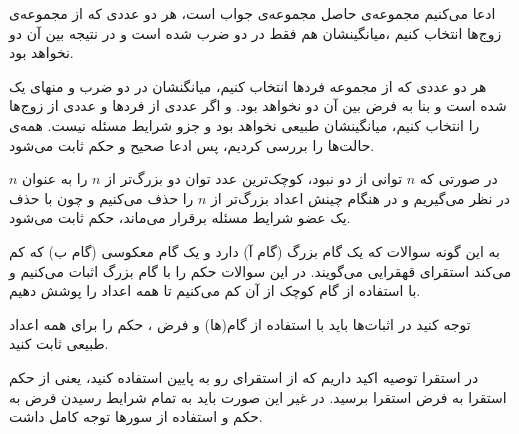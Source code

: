 \documentclass[11pt,largemargins]{h2wp}
\begin{document}
 	
 	
ادعا می‌کنیم مجموعه‌ی حاصل مجموعه‌ی جواب است، هر دو عددی که از مجموعه‌ی زوج‌ها انتخاب کنیم ،میانگینشان هم فقط در دو ضرب شده است و در نتیجه بین آن دو نخواهد بود.


هر دو عددی که از مجموعه فردها انتخاب کنیم، میانگنشان در دو ضرب و منهای یک شده است و بنا به فرض بین آن دو نخواهد بود.
و اگر عددی از فردها و عددی از زوج‌ها را انتخاب کنیم، میانگینشان طبیعی نخواهد بود و جزو شرایط مسئله نیست.
همه‌ی حالت‌ها را بررسی کردیم، پس ادعا صحیح و حکم ثابت می‌شود.


در صورتی که $n$ توانی از دو نبود، کوچک‌ترین عدد توان دو بزرگ‌تر از $n$ را به عنوان $n$ در نظر می‌گیریم  و در هنگام چینش اعداد بزرگ‌تر از $n$  را حذف می‌کنیم و چون با حذف یک عضو شرایط مسئله برقرار می‌ماند، حکم ثابت می‌شود.


 	\notes
 	
 	به این گونه سوالات که یک گام بزرگ (گام آ) دارد و یک گام معکوسی (گام ب) که کم می‌کند استقرای قهقرایی می‌گویند. در این سوالات حکم را با گام بزرگ اثبات می‌کنیم و با استفاده از گام کوچک از آن کم می‌کنیم تا همه اعداد را پوشش دهیم.
 	
 	 توجه کنید در اثبات‌ها باید با استفاده از گام(ها) و فرض ، حکم را برای همه اعداد طبیعی ثابت کنید.
 	 
 در استقرا توصیه اکید داریم که از استقرای رو به پایین استفاده کنید، یعنی از حکم استقرا به فرض استقرا برسید. در غیر این صورت باید به تمام شرایط رسیدن فرض به حکم و استفاده از سورها توجه کامل داشت.
 
\end{document}
